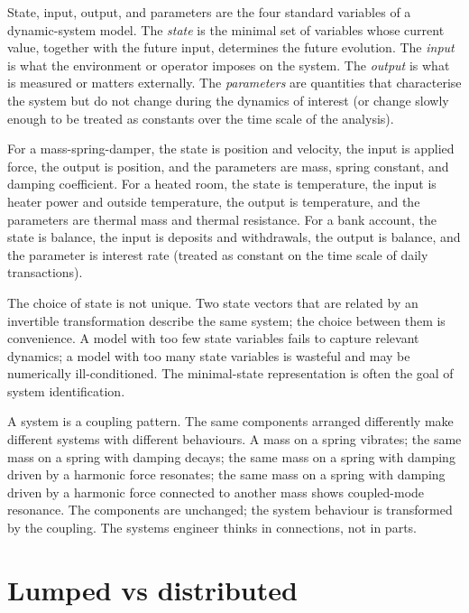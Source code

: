 State, input, output, and parameters are the four standard variables of a dynamic-system model. The \textit{state} is the minimal set of variables whose current value, together with the future input, determines the future evolution. The \textit{input} is what the environment or operator imposes on the system. The \textit{output} is what is measured or matters externally. The \textit{parameters} are quantities that characterise the system but do not change during the dynamics of interest (or change slowly enough to be treated as constants over the time scale of the analysis).

For a mass-spring-damper, the state is position and velocity, the input is applied force, the output is position, and the parameters are mass, spring constant, and damping coefficient. For a heated room, the state is temperature, the input is heater power and outside temperature, the output is temperature, and the parameters are thermal mass and thermal resistance. For a bank account, the state is balance, the input is deposits and withdrawals, the output is balance, and the parameter is interest rate (treated as constant on the time scale of daily transactions).

The choice of state is not unique. Two state vectors that are related by an invertible transformation describe the same system; the choice between them is convenience. A model with too few state variables fails to capture relevant dynamics; a model with too many state variables is wasteful and may be numerically ill-conditioned. The minimal-state representation is often the goal of system identification.

\begin{archetype}
A system is a coupling pattern. The same components arranged differently make different systems with different behaviours. A mass on a spring vibrates; the same mass on a spring with damping decays; the same mass on a spring with damping driven by a harmonic force resonates; the same mass on a spring with damping driven by a harmonic force connected to another mass shows coupled-mode resonance. The components are unchanged; the system behaviour is transformed by the coupling. The systems engineer thinks in connections, not in parts.
\end{archetype}

\section{Lumped vs distributed}

